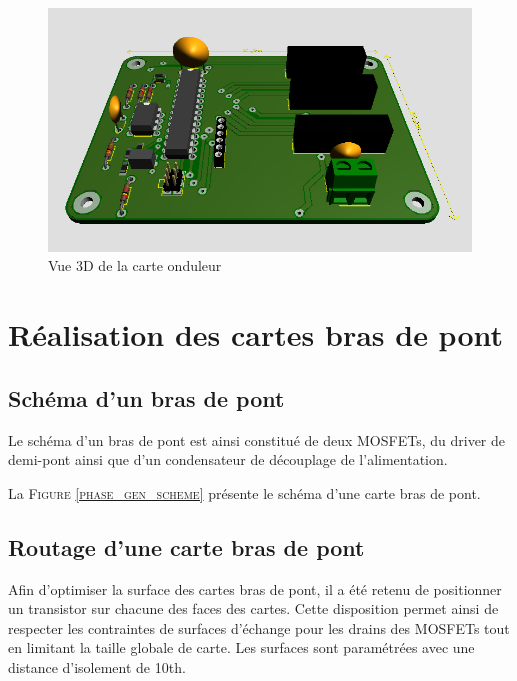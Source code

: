 \begin{landscape}
		\newpage
		
		\begin{figure}
			\begin{center}
				\includegraphics[scale=1.2]{../Illus/bridge_gen_3dview.png}
			\end{center}
			\caption{Vue 3D de la carte onduleur}
			\label{bridge_gen_3dview}
		\end{figure}
		
		\end{landscape}	 
	
		\newpage
		
	\section{Réalisation des cartes bras de pont}
	
		\subsection{Schéma d'un bras de pont}
		
		Le schéma d'un bras de pont est ainsi constitué de deux MOSFETs,
		du driver de demi-pont ainsi que d'un condensateur de découplage de
		l'alimentation.
		
		La \textsc{Figure \ref{phase_gen_scheme}} présente le schéma
		d'une carte bras de pont.
		
		
		\subsection{Routage d'une carte bras de pont}
		
		Afin d'optimiser la surface des cartes bras de pont, il a 
		été retenu de positionner un transistor sur chacune des faces
		des cartes. Cette disposition permet ainsi de respecter les
		contraintes de surfaces d'échange pour les drains des MOSFETs
		tout en limitant la taille globale de carte. Les surfaces
		sont paramétrées avec une distance d'isolement de 10th.
		
